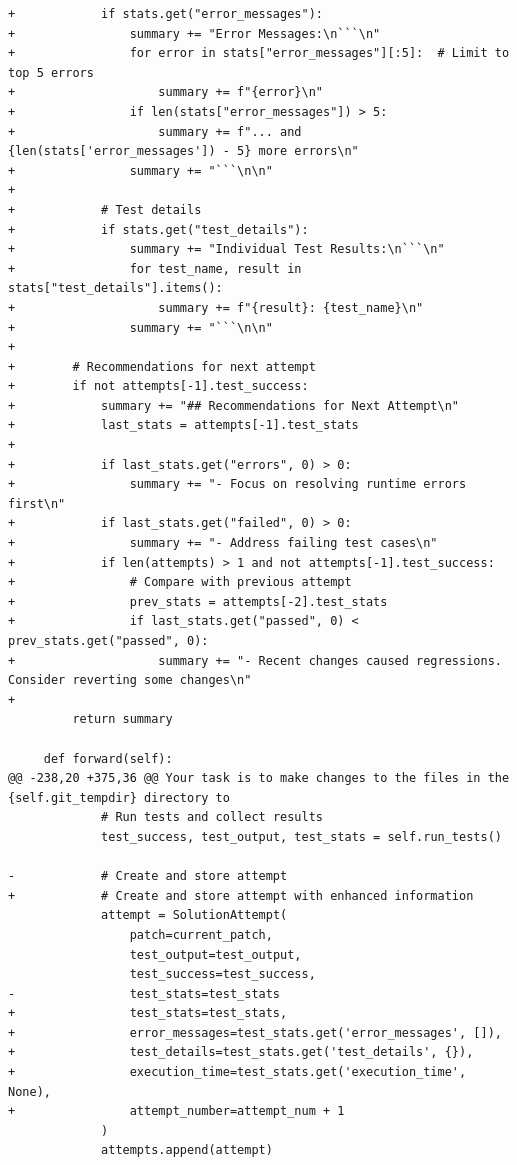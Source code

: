 \documentclass{article} %
\begin{document}
\begin{lstlisting}[style=diffstyle]
+            if stats.get("error_messages"):
+                summary += "Error Messages:\n```\n"
+                for error in stats["error_messages"][:5]:  # Limit to top 5 errors
+                    summary += f"{error}\n"
+                if len(stats["error_messages"]) > 5:
+                    summary += f"... and {len(stats['error_messages']) - 5} more errors\n"
+                summary += "```\n\n"
+            
+            # Test details
+            if stats.get("test_details"):
+                summary += "Individual Test Results:\n```\n"
+                for test_name, result in stats["test_details"].items():
+                    summary += f"{result}: {test_name}\n"
+                summary += "```\n\n"
+
+        # Recommendations for next attempt
+        if not attempts[-1].test_success:
+            summary += "## Recommendations for Next Attempt\n"
+            last_stats = attempts[-1].test_stats
+            
+            if last_stats.get("errors", 0) > 0:
+                summary += "- Focus on resolving runtime errors first\n"
+            if last_stats.get("failed", 0) > 0:
+                summary += "- Address failing test cases\n"
+            if len(attempts) > 1 and not attempts[-1].test_success:
+                # Compare with previous attempt
+                prev_stats = attempts[-2].test_stats
+                if last_stats.get("passed", 0) < prev_stats.get("passed", 0):
+                    summary += "- Recent changes caused regressions. Consider reverting some changes\n"
+            
         return summary
 
     def forward(self):
@@ -238,20 +375,36 @@ Your task is to make changes to the files in the {self.git_tempdir} directory to
             # Run tests and collect results 
             test_success, test_output, test_stats = self.run_tests()
             
-            # Create and store attempt
+            # Create and store attempt with enhanced information
             attempt = SolutionAttempt(
                 patch=current_patch,
                 test_output=test_output,
                 test_success=test_success,
-                test_stats=test_stats
+                test_stats=test_stats,
+                error_messages=test_stats.get('error_messages', []),
+                test_details=test_stats.get('test_details', {}),
+                execution_time=test_stats.get('execution_time', None),
+                attempt_number=attempt_num + 1
             )
             attempts.append(attempt)
             

\end{lstlisting}
\end{document}
